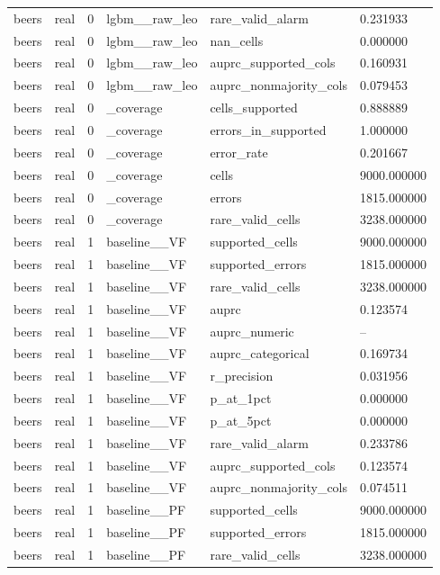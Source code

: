 \begin{tabular}{llllll}
beers & real & 0 & lgbm\_\_raw\_leo & rare\_valid\_alarm & 0.231933 \\
beers & real & 0 & lgbm\_\_raw\_leo & nan\_cells & 0.000000 \\
beers & real & 0 & lgbm\_\_raw\_leo & auprc\_supported\_cols & 0.160931 \\
beers & real & 0 & lgbm\_\_raw\_leo & auprc\_nonmajority\_cols & 0.079453 \\
beers & real & 0 & \_coverage & cells\_supported & 0.888889 \\
beers & real & 0 & \_coverage & errors\_in\_supported & 1.000000 \\
beers & real & 0 & \_coverage & error\_rate & 0.201667 \\
beers & real & 0 & \_coverage & cells & 9000.000000 \\
beers & real & 0 & \_coverage & errors & 1815.000000 \\
beers & real & 0 & \_coverage & rare\_valid\_cells & 3238.000000 \\
beers & real & 1 & baseline\_\_VF & supported\_cells & 9000.000000 \\
beers & real & 1 & baseline\_\_VF & supported\_errors & 1815.000000 \\
beers & real & 1 & baseline\_\_VF & rare\_valid\_cells & 3238.000000 \\
beers & real & 1 & baseline\_\_VF & auprc & 0.123574 \\
beers & real & 1 & baseline\_\_VF & auprc\_numeric & -- \\
beers & real & 1 & baseline\_\_VF & auprc\_categorical & 0.169734 \\
beers & real & 1 & baseline\_\_VF & r\_precision & 0.031956 \\
beers & real & 1 & baseline\_\_VF & p\_at\_1pct & 0.000000 \\
beers & real & 1 & baseline\_\_VF & p\_at\_5pct & 0.000000 \\
beers & real & 1 & baseline\_\_VF & rare\_valid\_alarm & 0.233786 \\
beers & real & 1 & baseline\_\_VF & auprc\_supported\_cols & 0.123574 \\
beers & real & 1 & baseline\_\_VF & auprc\_nonmajority\_cols & 0.074511 \\
beers & real & 1 & baseline\_\_PF & supported\_cells & 9000.000000 \\
beers & real & 1 & baseline\_\_PF & supported\_errors & 1815.000000 \\
beers & real & 1 & baseline\_\_PF & rare\_valid\_cells & 3238.000000 \\

\end{tabular}
